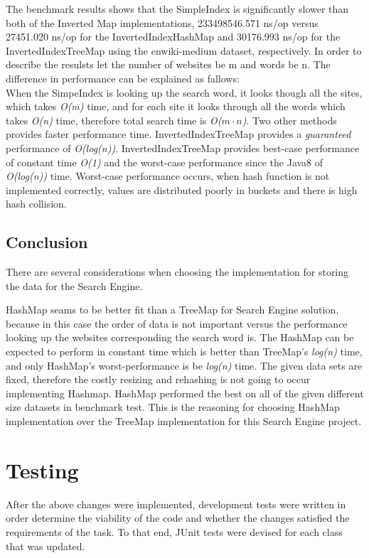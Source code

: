The benchmark results shows that the SimpleIndex is significantly slower than both of the Inverted Map implementations, 233498546.571 ns/op versus 27451.020 ns/op for the InvertedIndexHashMap and 30176.993 ns/op for the InvertedIndexTreeMap using the enwiki-medium dataset, respectively. 
In order to describe the resulsts let the number of websites be m and words be n. 
The difference in performance can be explained as fallows: \\
When the SimpeIndex is looking up the search word, it looks though all the sites, which takes \textit{O(m)} time, and for each site it looks through all the words which takes \textit{O(n)} time, therefore total search time is \textit{O($m\cdot n$)}. Two other methods provides faster performance time. InvertedIndexTreeMap provides a  \textit{guaranteed} performance of \textit{O(log(n))}. InvertedIndexTreeMap provides best-case performance of constant time \textit{O(1)} and the worst-case performance since the Java8 of \textit{O(log(n))} time. Worst-case performance occurs, when hash function is not implemented correctly, values are distributed poorly in buckets and there is high hash collision.



\subsection{Conclusion}
There are several considerations when choosing the implementation for storing the data for the Search Engine. 

HashMap seams to be better fit than a TreeMap for Search Engine solution, because in this case the order of data is not important versus the performance looking up the websites corresponding the search word is. The HashMap can be expected to perform in constant time which is better than TreeMap's \textit{log(n)} time, and only HashMap's worst-performance is be \textit{log(n)} time. The given data sets are fixed, therefore the costly resizing and rehashing is not going to occur implementing Hashmap. HashMap performed the best on all of the given different size datasets in benchmark test. This is the reasoning for choosing HashMap implementation over the TreeMap implementation for this Search Engine project.




\section{Testing}
After the above changes were implemented, development tests were written in order determine the viability of the code and whether the changes satisfied the requirements of the task. To that end, JUnit tests were devised for each class that was updated.

